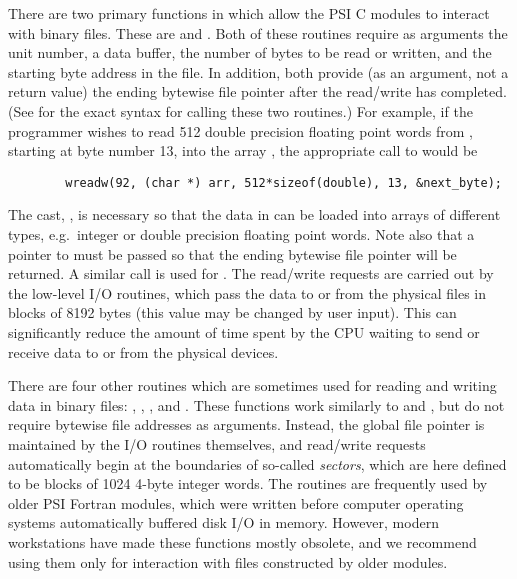 There are two primary functions in  which allow the
PSI C modules to interact with binary files.  These are
 and .  Both of these routines require
as arguments the unit number, a data buffer, the number of bytes to be
read or written, and the starting byte address in the file.  In
addition, both provide (as an argument, not a return value) the ending
bytewise file pointer after the read/write has completed.  (See
 for the exact syntax for calling these two
routines.)  For example, if the programmer wishes to read 512 double
precision floating point words from , starting at byte number
13, into the array , the appropriate call to
 would be
\begin{verbatim}
        wreadw(92, (char *) arr, 512*sizeof(double), 13, &next_byte);
\end{verbatim}
The cast, , is necessary so that the data in 
can be loaded into arrays of different types, e.g.~integer or double
precision floating point words.  Note also that a pointer to
 must be passed so that the ending bytewise file
pointer will be returned.  A similar call is used for
.  The read/write requests are carried out by the
low-level I/O routines, which pass the data to or from the physical
files in blocks of 8192 bytes (this value may be changed by user
input).  This can significantly reduce the amount of time spent by the
CPU waiting to send or receive data to or from the physical devices.

There are four other routines which are sometimes used for reading and
writing data in binary files: , ,
, and .  These functions work similarly
to  and , but do not require bytewise
file addresses as arguments.  Instead, the global file pointer is
maintained by the I/O routines themselves, and read/write requests
automatically begin at the boundaries of so-called {\em sectors},
which are here defined to be blocks of 1024 4-byte integer words.  The
routines are frequently used by older PSI Fortran modules, which were
written before computer operating systems automatically buffered disk
I/O in memory.  However, modern workstations have made these functions
mostly obsolete, and we recommend using them only for interaction with
files constructed by older modules.
